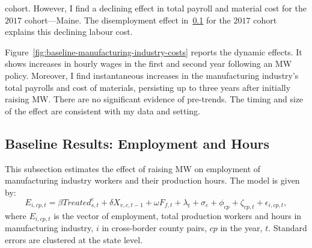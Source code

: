 \documentclass{C:/Users/david/OneDrive/Documents/ULMS/PhD/Thesis/chapter3/src/climate_change/latex/Economic_Journal/OUP-EJ}
\begin{document}
cohort. However, I find a declining effect in total payroll and material cost for the $2017$ cohort---Maine. The disemployment effect in~\ref{subsec:baseline-results-employment-and-hours} for the $2017$ cohort explains this declining labour cost.
    

    Figure~\ref{fig:baseline-manufacturing-industry-costs} reports the dynamic effects. It shows increases in hourly wages in the first and second year following an MW policy. Moreover, I find instantaneous increases in the manufacturing industry's total payrolls and cost of materials, persisting up to three years after initially raising MW. There are no significant evidence of pre-trends. The timing and size of the effect are consistent with my data and setting.

    \subsection{Baseline Results: Employment and Hours}\label{subsec:baseline-results-employment-and-hours}
    This subsection estimates the effect of raising MW on employment of manufacturing industry workers and their production hours. The model is given by:
    \begin{equation}
        E_{i,cp,t} = \beta Treated_{s,t}^e + \delta X_{v,c,t-1} + \omega F_{f,t} + \lambda_{t} + \sigma_{c} + \phi_{cp} + \zeta_{cp,t} + \epsilon_{i,cp,t},\label{eq:baseline-emp-hours}
    \end{equation}
    where $E_{i,cp,t}$ is the vector of employment, total production workers and hours in manufacturing industry, $i$ in cross-border county pairs, $cp$ in the year, $t$. Standard errors are clustered at the state level.
    
\end{document}
